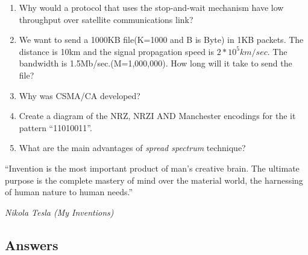 \documentclass{exmppr}
\begin{document}
\begin{enumerate}
\begin{enumerate}
\end{enumerate}
\item Why would a protocol that uses the stop-and-wait mechanism have low throughput over satellite communications link?

\item We want to send a 1000KB file(K=1000 and B is Byte) in 1KB packets. The distance is 10km and the signal propagation speed is $2*10^5 km/sec$. The bandwidth is 1.5Mb/sec.(M=1,000,000). How long will it take to send the file?

\item Why was CSMA/CA developed?

\item Create a diagram of the NRZ, NRZI AND Manchester encodings for the it pattern ``11010011''.

\item What are the main advantages of \textit{spread spectrum} technique?


\end{enumerate}
\hrulefill

\epigraph{``Invention is the most important product of man's creative brain. The ultimate purpose is the complete mastery of mind over the material world, the harnessing of human nature to human needs.''}{\textit{Nikola Tesla (My Inventions)}}

\newpage
\begin{center}\section*{Answers}\end{center}
%
\end{document}
